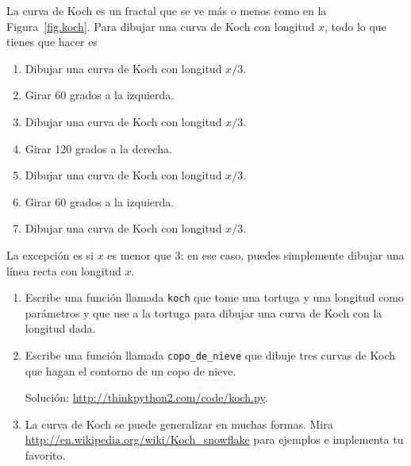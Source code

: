 \documentclass[10pt]{book}
\begin{document}
\begin{exercise}

La curva de Koch es un fractal que se ve más o menos como en la
Figura~\ref{fig.koch}.  Para dibujar una curva de Koch con longitud $x$, todo lo que
tienes que hacer es

\begin{enumerate}

\item Dibujar una curva de Koch con longitud $x/3$.

\item Girar 60 grados a la izquierda.

\item Dibujar una curva de Koch con longitud $x/3$.

\item Girar 120 grados a la derecha.

\item Dibujar una curva de Koch con longitud $x/3$.

\item Girar 60 grados a la izquierda.

\item Dibujar una curva de Koch con longitud $x/3$.

\end{enumerate}

La excepción es si $x$ es menor que 3: en ese caso,
puedes simplemente dibujar una línea recta con longitud $x$.

\begin{enumerate}

\item Escribe una función llamada {\tt koch} que tome una tortuga y
una longitud como parámetros y que use a la tortuga para dibujar una curva de Koch
con la longitud dada.

\item Escribe una función llamada {\tt copo\_de\_nieve} que dibuje tres
curvas de Koch que hagan el contorno de un copo de nieve.

Solución: \url{http://thinkpython2.com/code/koch.py}.

\item La curva de Koch se puede generalizar en muchas formas.  Mira
\url{http://en.wikipedia.org/wiki/Koch_snowflake} para ejemplos e
implementa tu favorito.

\end{enumerate}
\end{exercise}
\end{document}
